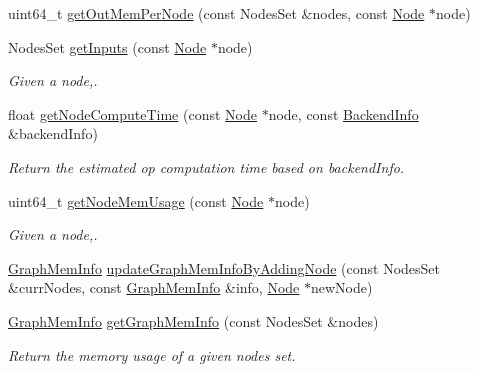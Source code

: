\begin{DoxyCompactItemize}
\item 
uint64\+\_\+t \hyperlink{namespaceglow_a4c7ea6df70770cd2ccf2bbfb85077539}{get\+Out\+Mem\+Per\+Node} (const Nodes\+Set \&nodes, const \hyperlink{classglow_1_1_node}{Node} $\ast$node)
\item 
Nodes\+Set \hyperlink{namespaceglow_a589ee9d58bb8726a5e764b1dd74f8070}{get\+Inputs} (const \hyperlink{classglow_1_1_node}{Node} $\ast$node)
\begin{DoxyCompactList}\small\item\em Given a node,. \end{DoxyCompactList}\item 
\mbox{\label{namespaceglow_a126aa14fbeafec59916bb142ecac0541}} 
float \hyperlink{namespaceglow_a126aa14fbeafec59916bb142ecac0541}{get\+Node\+Compute\+Time} (const \hyperlink{classglow_1_1_node}{Node} $\ast$node, const \hyperlink{structglow_1_1_backend_info}{Backend\+Info} \&backend\+Info)
\begin{DoxyCompactList}\small\item\em Return the estimated op computation time based on {\ttfamily backend\+Info}. \end{DoxyCompactList}\item 
uint64\+\_\+t \hyperlink{namespaceglow_a59d8826ffac432ffcebc8dcd11a85816}{get\+Node\+Mem\+Usage} (const \hyperlink{classglow_1_1_node}{Node} $\ast$node)
\begin{DoxyCompactList}\small\item\em Given a node,. \end{DoxyCompactList}\item 
\hyperlink{structglow_1_1_graph_mem_info}{Graph\+Mem\+Info} \hyperlink{namespaceglow_aa54619319c88d7ceb184f4dd70af8ccf}{update\+Graph\+Mem\+Info\+By\+Adding\+Node} (const Nodes\+Set \&curr\+Nodes, const \hyperlink{structglow_1_1_graph_mem_info}{Graph\+Mem\+Info} \&info, \hyperlink{classglow_1_1_node}{Node} $\ast$new\+Node)
\item 
\mbox{\label{namespaceglow_af21f64a0aca1ada898039dbe69053bfd}} 
\hyperlink{structglow_1_1_graph_mem_info}{Graph\+Mem\+Info} \hyperlink{namespaceglow_af21f64a0aca1ada898039dbe69053bfd}{get\+Graph\+Mem\+Info} (const Nodes\+Set \&nodes)
\begin{DoxyCompactList}\small\item\em Return the memory usage of a given nodes set. \end{DoxyCompactList}\item 

\end{DoxyCompactItemize}

